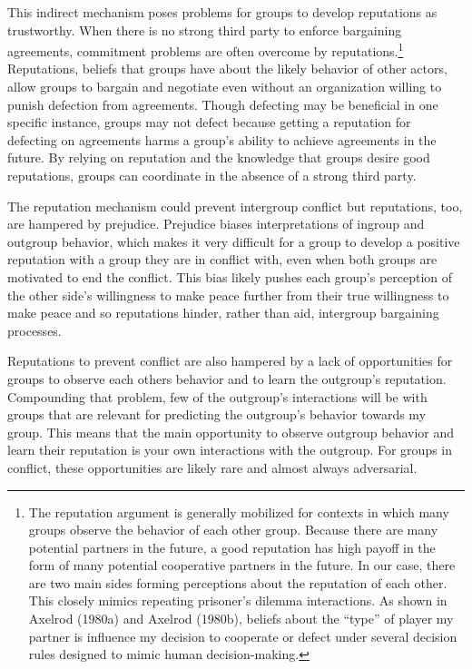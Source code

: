 \documentclass[11pt]{article}
\begin{document}
This indirect mechanism poses problems for groups to develop reputations
as trustworthy. When there is no strong third party to enforce
bargaining agreements, commitment problems are often overcome by
reputations.\footnote{The reputation argument is generally mobilized for
  contexts in which many groups observe the behavior of each other
  group. Because there are many potential partners in the future, a good
  reputation has high payoff in the form of many potential cooperative
  partners in the future. In our case, there are two main sides forming
  perceptions about the reputation of each other. This closely mimics
  repeating prisoner's dilemma interactions. As shown in Axelrod (1980a)
  and Axelrod (1980b), beliefs about the ``type'' of player my partner
  is influence my decision to cooperate or defect under several decision
  rules designed to mimic human decision-making.} Reputations, beliefs
that groups have about the likely behavior of other actors, allow groups
to bargain and negotiate even without an organization willing to punish
defection from agreements. Though defecting may be beneficial in one
specific instance, groups may not defect because getting a reputation
for defecting on agreements harms a group's ability to achieve
agreements in the future. By relying on reputation and the knowledge
that groups desire good reputations, groups can coordinate in the
absence of a strong third party.

The reputation mechanism could prevent intergroup conflict but
reputations, too, are hampered by prejudice. Prejudice biases
interpretations of ingroup and outgroup behavior, which makes it very
difficult for a group to develop a positive reputation with a group they
are in conflict with, even when both groups are motivated to end the
conflict. This bias likely pushes each group's perception of the other
side's willingness to make peace further from their true willingness to
make peace and so reputations hinder, rather than aid, intergroup
bargaining processes.

Reputations to prevent conflict are also hampered by a lack of
opportunities for groups to observe each others behavior and to learn
the outgroup's reputation. Compounding that problem, few of the
outgroup's interactions will be with groups that are relevant for
predicting the outgroup's behavior towards my group. This means that the
main opportunity to observe outgroup behavior and learn their reputation
is your own interactions with the outgroup. For groups in conflict,
these opportunities are likely rare and almost always adversarial.
\end{document}
